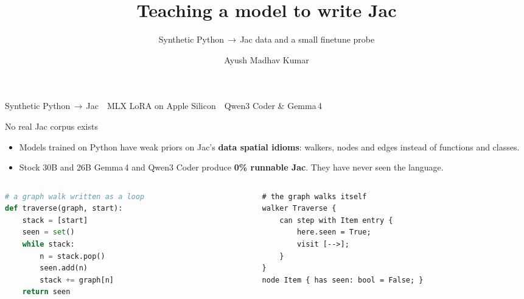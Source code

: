 \documentclass[aspectratio=169,11pt]{beamer}
\title{\textbf{Teaching a model to write Jac}}
\subtitle{Synthetic Python\,$\rightarrow$\,Jac data and a small finetune probe}
\author{Ayush Madhav Kumar}
\institute{University of Michigan \,\textbullet\, Jaseci}
\date{}
\begin{document}
\begin{frame}[plain]
  \titlepage
  \vfill
  \begin{center}\small\color{soft}
    Synthetic Python\,$\rightarrow$\,Jac \,\textbullet\, MLX LoRA on Apple Silicon \,\textbullet\, Qwen3 Coder \& Gemma\,4
  \end{center}
\end{frame}

\begin{frame}[fragile]{No real Jac corpus exists}
  \begin{itemize}
    \item Models trained on Python have weak priors on Jac's \textbf{data spatial idioms}:
          walkers, nodes and edges instead of functions and classes.
    \item Stock 30B and 26B Gemma\,4 and Qwen3 Coder produce \textbf{0\% runnable Jac}.
          They have never seen the language.
  \end{itemize}
  \vspace{2mm}
  \begin{columns}[t]
    \begin{column}{0.48\textwidth}
      \begin{lstlisting}[style=code,language=Python]
# a graph walk written as a loop
def traverse(graph, start):
    stack = [start]
    seen = set()
    while stack:
        n = stack.pop()
        seen.add(n)
        stack += graph[n]
    return seen
      \end{lstlisting}
    \end{column}
    \begin{column}{0.48\textwidth}
      \begin{lstlisting}[style=code,language=Jac]
# the graph walks itself
walker Traverse {
    can step with Item entry {
        here.seen = True;
        visit [-->];
    }
}
node Item { has seen: bool = False; }
      \end{lstlisting}
    \end{column}
  \end{columns}
\end{frame}
\end{document}
